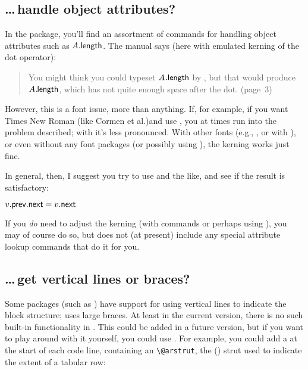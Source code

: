 \documentclass[a4paper]{article}
\let\braces\brackets
\begin{document}
\subsection{\dots\,handle object attributes?}

In the  package, you'll find
an assortment of commands for handling
object attributes such as $A.\textsf{length}$. The manual says (here with emulated
kerning of the dot operator):

\begin{quote}
    You might think you could typeset $A\mkern1mu.\textsf{length}$ by
    \code{\$A.\cs{id}\braces{length}\$}, but that would produce
    $A\mkern1mu.\mkern-1.5mu\textsf{length}$, which has not quite enough space
    after the dot. \hfill(page~3)
\end{quote}

\noindent
However, this is a font issue, more than anything. If, for example, if you
want Times New Roman (like Cormen et al.)\@ and use
, you at times run into the problem
described; with  it's less pronounced.
With other fonts (e.g.,
,
 or
 with
), or even without any font
packages (or possibly using ), the kerning works just fine.

In general, then, I suggest you try to use \code{\$A.\cs{id}\braces{length}\$}
and the like, and see if the result is satisfactory:

\begin{texexp}
$v.\textsf{prev}.\textsf{next} = v.\textsf{next}$
\end{texexp}

\noindent
If you \emph{do} need to adjust the kerning (with  commands or
perhaps using ), you may of
course do so, but  does not (at present) include any special
attribute lookup commands that do it for you.

\subsection{\dots\,get vertical lines or braces?}

Some packages (such as )
have support for using vertical lines to indicate the block structure;
uses large braces. At least in the current version, there is no such built-in
functionality in . This could be added in a future version, but if
you want to play around with it yourself, you could use
. For example, you could add a 
at the start of each code line, containing an \verb|\@arstrut|, the
() strut used to indicate the extent of
a tabular row:
\end{document}
